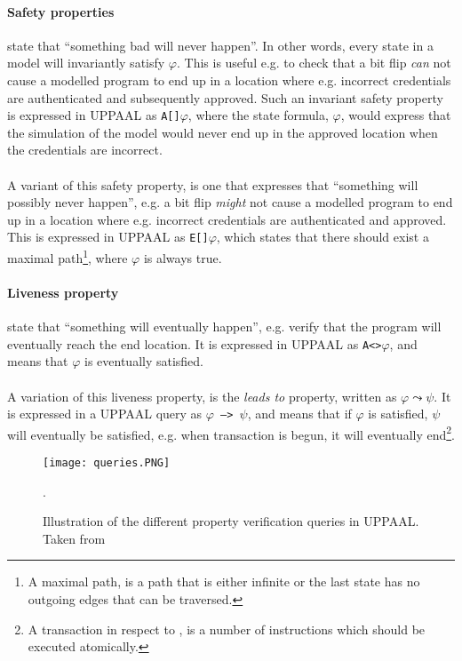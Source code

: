\paragraph{Safety properties} state that ``something bad will never happen''. In other words, every state in a model will invariantly satisfy $\varphi$. This is useful e.g. to check that a bit flip \textit{can} not cause a modelled program to end up in a location where e.g. incorrect credentials are authenticated and subsequently approved. Such an invariant safety property is expressed in UPPAAL as \texttt{A[]$\varphi$}, where the state formula, $\varphi$, would express that the simulation of the model would never end up in the approved location when the credentials are incorrect.\\\\
A variant of this safety property, is one that expresses that ``something will possibly never happen'', e.g. a bit flip \textit{might} not cause a modelled program to end up in a location where e.g. incorrect credentials are authenticated and approved. This is expressed in UPPAAL as \texttt{E[]$\varphi$}, which states that there should exist a maximal path\footnote{A maximal path, is a path that is either infinite or the last state has no outgoing edges that can be traversed.}, where $\varphi$ is always true.
\paragraph{Liveness property} state that ``something will eventually happen'', e.g. verify that the program will eventually reach the end location. It is expressed in UPPAAL as \texttt{A<>$\varphi$}, and means that $\varphi$ is eventually satisfied.\\\\
A variation of this liveness property, is the \textit{leads to} property, written as $\varphi \leadsto \psi$. It is expressed in a UPPAAL query as \texttt{$\varphi$ --> $\psi$}, and means that if $\varphi$ is satisfied, $\psi$ will eventually be satisfied, e.g. when \jc transaction is begun, it will eventually end\footnote{A transaction in respect to \jc, is a number of instructions which should be executed atomically.}.

\begin{figure}[H]
\centering
\texttt{[image: queries.PNG]}
\caption{Illustration of the different property verification queries in UPPAAL. Taken from~\cite[p. 8]{upptut}}.
\label{fig:query}
\end{figure}

